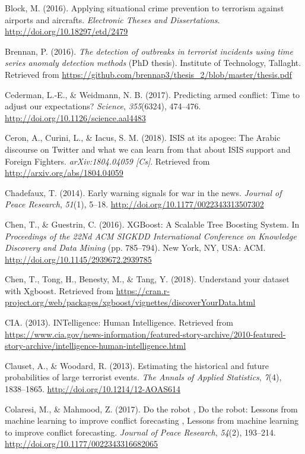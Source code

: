 \documentclass[11pt,oneside,a4paper]{reedthesis}
\begin{document}
\hypertarget{ref-Block_2016}{}
Block, M. (2016). Applying situational crime prevention to terrorism
against airports and aircrafts. \emph{Electronic Theses and
Dissertations}. \url{http://doi.org/10.18297/etd/2479}

\hypertarget{ref-Brennan_2016}{}
Brennan, P. (2016). \emph{The detection of outbreaks in terrorist
incidents using time series anomaly detection methods} (PhD thesis).
Institute of Technology, Tallaght. Retrieved from
\url{https://github.com/brennap3/thesis_2/blob/master/thesis.pdf}

\hypertarget{ref-Cederman_2017}{}
Cederman, L.-E., \& Weidmann, N. B. (2017). Predicting armed conflict:
Time to adjust our expectations? \emph{Science}, \emph{355}(6324),
474--476. \url{http://doi.org/10.1126/science.aal4483}

\hypertarget{ref-Ceron_2018}{}
Ceron, A., Curini, L., \& Iacus, S. M. (2018). ISIS at its apogee: The
Arabic discourse on Twitter and what we can learn from that about ISIS
support and Foreign Fighters. \emph{arXiv:1804.04059 {[}Cs{]}}.
Retrieved from \url{http://arxiv.org/abs/1804.04059}

\hypertarget{ref-Chadefaux_2014}{}
Chadefaux, T. (2014). Early warning signals for war in the news.
\emph{Journal of Peace Research}, \emph{51}(1), 5--18.
\url{http://doi.org/10.1177/0022343313507302}

\hypertarget{ref-Chen_2016}{}
Chen, T., \& Guestrin, C. (2016). XGBoost: A Scalable Tree Boosting
System. In \emph{Proceedings of the 22Nd ACM SIGKDD International
Conference on Knowledge Discovery and Data Mining} (pp. 785--794). New
York, NY, USA: ACM. \url{http://doi.org/10.1145/2939672.2939785}

\hypertarget{ref-Chen_2018}{}
Chen, T., Tong, H., Benesty, M., \& Tang, Y. (2018). Understand your
dataset with Xgboost. Retrieved from
\url{https://cran.r-project.org/web/packages/xgboost/vignettes/discoverYourData.html}

\hypertarget{ref-CIA_2013}{}
CIA. (2013). INTelligence: Human Intelligence. Retrieved from
\url{https://www.cia.gov/news-information/featured-story-archive/2010-featured-story-archive/intelligence-human-intelligence.html}

\hypertarget{ref-Clauset_2013}{}
Clauset, A., \& Woodard, R. (2013). Estimating the historical and future
probabilities of large terrorist events. \emph{The Annals of Applied
Statistics}, \emph{7}(4), 1838--1865.
\url{http://doi.org/10.1214/12-AOAS614}

\hypertarget{ref-Colaresi_2017}{}
Colaresi, M., \& Mahmood, Z. (2017). Do the robot , Do the robot:
Lessons from machine learning to improve conflict forecasting , Lessons
from machine learning to improve conflict forecasting. \emph{Journal of
Peace Research}, \emph{54}(2), 193--214.
\url{http://doi.org/10.1177/0022343316682065}
\end{document}
